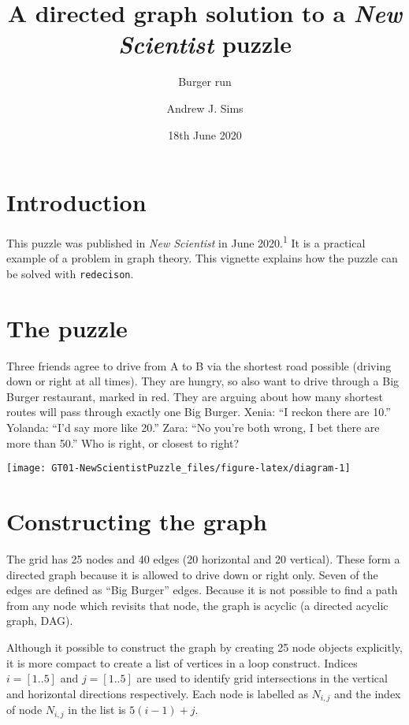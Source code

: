 \documentclass[
]{article}
\title{A directed graph solution to a \emph{New Scientist} puzzle}
\subtitle{Burger run}
\author{Andrew J. Sims}
\date{18th June 2020}
\begin{document}
\maketitle

\hypertarget{introduction}{%
\section{Introduction}\label{introduction}}

This puzzle was published in \emph{New Scientist} in June
2020.\textsuperscript{1} It is a practical example of a problem in graph
theory. This vignette explains how the puzzle can be solved with
\texttt{redecison}.

\hypertarget{the-puzzle}{%
\section{The puzzle}\label{the-puzzle}}

Three friends agree to drive from A to B via the shortest road possible
(driving down or right at all times). They are hungry, so also want to
drive through a Big Burger restaurant, marked in red. They are arguing
about how many shortest routes will pass through exactly one Big Burger.
Xenia: ``I reckon there are 10.'' Yolanda: ``I'd say more like 20.''
Zara: ``No you're both wrong, I bet there are more than 50.'' Who is
right, or closest to right?

\begin{center}\texttt{[image: GT01-NewScientistPuzzle\_files/figure-latex/diagram-1]} \end{center}

\hypertarget{constructing-the-graph}{%
\section{Constructing the graph}\label{constructing-the-graph}}

The grid has 25 nodes and 40 edges (20 horizontal and 20 vertical).
These form a directed graph because it is allowed to drive down or right
only. Seven of the edges are defined as ``Big Burger'' edges. Because it
is not possible to find a path from any node which revisits that node,
the graph is acyclic (a directed acyclic graph, DAG).

Although it possible to construct the graph by creating 25 node objects
explicitly, it is more compact to create a list of vertices in a loop
construct. Indices \(i = [1 .. 5]\) and \(j = [1 .. 5]\) are used to
identify grid intersections in the vertical and horizontal directions
respectively. Each node is labelled as \(N_{i,j}\) and the index of node
\(N_{i,j}\) in the list is \(5(i-1)+j\).
\end{document}
